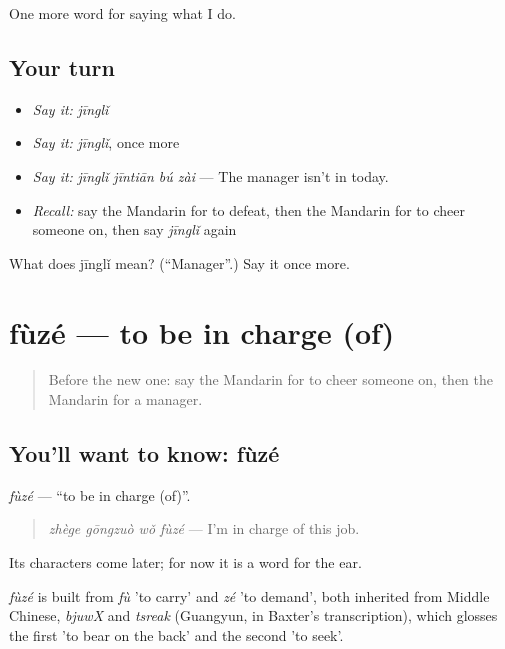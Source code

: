\begin{grammarlens}[title={What you've built}]
One more word for saying what I do.
\end{grammarlens}

\subsection*{Your turn}
\begin{itemize}
\raggedright
  \item \emph{Say it:} \emph{jīnglǐ}
  \item \emph{Say it:} \emph{jīnglǐ}, once more
  \item \emph{Say it:} \emph{jīnglǐ jīntiān bú zài} — The manager isn't in today.
  \item \emph{Recall:} say the Mandarin for to defeat, then the Mandarin for to cheer someone on, then say \emph{jīnglǐ} again
\end{itemize}

\begin{tcolorbox}[breakable,colback=teal!4,colframe=teal!35!black,title={Before you move on}]
What does jīnglǐ mean? (\textquotedblleft{}Manager\textquotedblright{}.) Say it once more.
\end{tcolorbox}
\section[fùzé]{fùzé — to be in charge (of)}

\label{lesson:ZH-C263-fuze}



\begin{quote}
Before the new one: say the Mandarin for to cheer someone on, then the Mandarin for a manager.
\end{quote}

\subsection*{You'll want to know: fùzé}
\emph{fùzé} — \textquotedblleft{}to be in charge (of)\textquotedblright{}.

\begin{quote}
\emph{zhège gōngzuò wǒ fùzé} — I'm in charge of this job.
\end{quote}

Its characters come later; for now it is a word for the ear.

\begin{cousinweb}
\emph{fùzé} is built from \emph{fù} 'to carry' and \emph{zé} 'to demand', both inherited from Middle Chinese, \emph{bjuwX} and \emph{tsreak} (Guangyun, in Baxter's transcription), which glosses the first 'to bear on the back' and the second 'to seek'.
\end{cousinweb}


